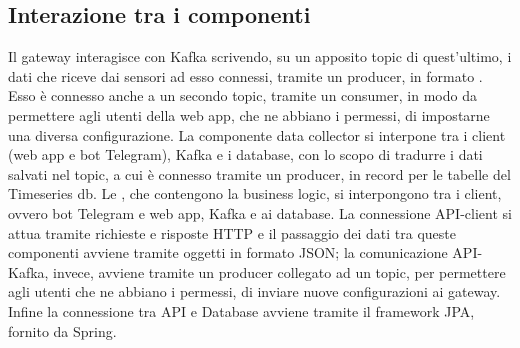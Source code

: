 	\subsection{Interazione tra i componenti}
	Il gateway interagisce con Kafka scrivendo, su un apposito topic di quest'ultimo, i dati che riceve dai sensori ad esso connessi, tramite un producer, in formato .
	\newline
	Esso è connesso anche a un secondo topic, tramite un consumer, in modo da permettere agli utenti della web app, che ne abbiano i permessi, di impostarne una diversa configurazione.
	\newline
	La componente data collector si interpone tra i client (web app e bot Telegram), Kafka e i database, con lo scopo di tradurre i dati  salvati nel topic, a cui è connesso tramite un producer, in record per le tabelle del Timeseries db.
	\newline
	Le , che contengono la business logic, si interpongono tra i client, ovvero bot Telegram e web app, Kafka e ai database.
	\newline
	La connessione API-client si attua tramite richieste e risposte HTTP e il passaggio dei dati tra queste componenti avviene tramite oggetti in formato JSON; la comunicazione API-Kafka, invece, avviene tramite un producer collegato ad un topic, per permettere agli utenti che ne abbiano i permessi, di inviare nuove configurazioni ai gateway.
	\newline
	Infine la connessione tra API e Database avviene tramite il framework JPA, fornito da Spring.  
	
